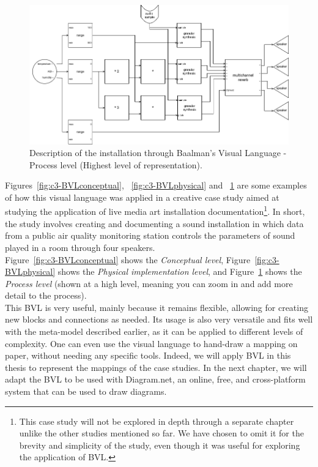 \begin{figure}[!h]
    \centering
    \includegraphics[width=0.7\linewidth]{chapters/3-mdc_model-reactivation_workflow-instruction_template/image/graph03-BVLprocess.png}
    \caption{Description of the installation through Baalman’s Visual Language - Process level (Highest level of representation).}
    \label{fig:c3-BVLprocess}
\end{figure} 
Figures~\ref{fig:c3-BVLconceptual}, ~\ref{fig:c3-BVLphysical} and ~\ref{fig:c3-BVLprocess} are some examples of how this visual language was applied in a creative case study aimed at studying the application of live media art installation documentation\footnote{This case study will not be explored in depth through a separate chapter unlike the other studies mentioned so far. We have chosen to omit it for the brevity and simplicity of the study, even though it was useful for exploring the application of BVL.}. In short, the study involves creating and documenting a sound installation in which data from a public air quality monitoring station controls the parameters of sound played in a room through four speakers.\\
Figure~\ref{fig:c3-BVLconceptual} shows the \textit{Conceptual level}, Figure~\ref{fig:c3-BVLphysical} shows the \textit{Physical implementation level}, and Figure~\ref{fig:c3-BVLprocess} shows the \textit{Process level} (shown at a high level, meaning you can zoom in and add more detail to the process).\\
This BVL is very useful, mainly because it remains flexible, allowing for creating new blocks and connections as needed. Its usage is also very versatile and fits well with the meta-model described earlier, as it can be applied to different levels of complexity. One can even use the visual language to hand-draw a mapping on paper, without needing any specific tools. Indeed, we will apply BVL in this thesis to represent the mappings of the case studies. In the next chapter, we will adapt the BVL to be used with Diagram.net, an online, free, and cross-platform system that can be used to draw diagrams.\\
